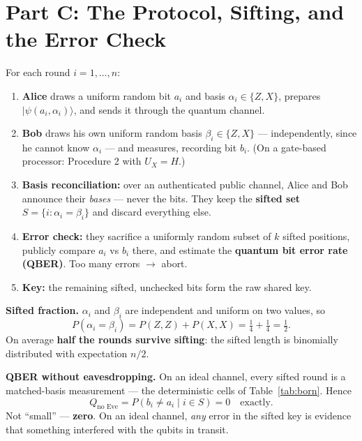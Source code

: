 \documentclass[a4paper,11pt]{article}
\providecommand{\ket}[1]{|#1\rangle}
\begin{document}
\section{Part C: The Protocol, Sifting, and the Error Check}

For each round $i = 1, \dots, n$:

\begin{enumerate}
    \item \textbf{Alice} draws a uniform random bit $a_i$ and basis
          $\alpha_i \in \{Z, X\}$, prepares $\ket{\psi(a_i, \alpha_i)}$, and sends
          it through the quantum channel.
    \item \textbf{Bob} draws his own uniform random basis $\beta_i \in \{Z, X\}$ ---
          independently, since he cannot know $\alpha_i$ --- and measures, recording
          bit $b_i$. (On a gate-based processor: Procedure 2 with $U_X = H$.)
    \item \textbf{Basis reconciliation:} over an authenticated public channel, Alice
          and Bob announce their \emph{bases} --- never the bits. They keep the
          \textbf{sifted set} $S = \{i : \alpha_i = \beta_i\}$ and discard everything
          else.
    \item \textbf{Error check:} they sacrifice a uniformly random subset of $k$
          sifted positions, publicly compare $a_i$ vs $b_i$ there, and estimate the
          \textbf{quantum bit error rate (QBER)}. Too many errors $\rightarrow$ abort.
    \item \textbf{Key:} the remaining sifted, unchecked bits form the raw shared key.
\end{enumerate}

\begin{theorybox}
\textbf{Sifted fraction.} $\alpha_i$ and $\beta_i$ are independent and uniform on
two values, so
\begin{equation}
    P(\alpha_i = \beta_i) = P(Z,Z) + P(X,X) = \tfrac{1}{4} + \tfrac{1}{4}
    = \tfrac{1}{2}.
    \label{eq:sift}
\end{equation}
On average \textbf{half the rounds survive sifting}: the sifted length is
binomially distributed with expectation $n/2$.
\end{theorybox}

\begin{theorybox}
\textbf{QBER without eavesdropping.} On an ideal channel, every sifted round is a
matched-basis measurement --- the deterministic cells of Table~\ref{tab:born}. Hence
\begin{equation}
    Q_{\text{no Eve}} = P(b_i \neq a_i \mid i \in S) = 0 \quad \text{exactly.}
    \label{eq:qzero}
\end{equation}
Not ``small'' --- \textbf{zero}. On an ideal channel, \emph{any} error in the sifted
key is evidence that something interfered with the qubits in transit.
\end{theorybox}
\end{document}
